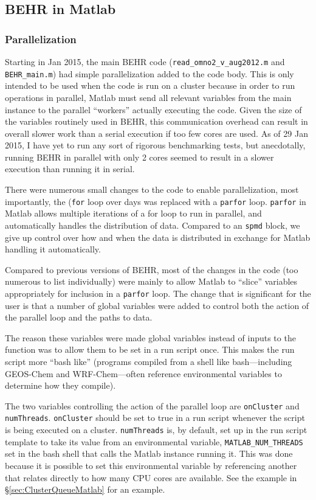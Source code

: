 \documentclass[12pt]{article}
\begin{document}
	\subsection{BEHR in Matlab}
	\subsubsection{Parallelization}
		Starting in Jan 2015, the main BEHR code (\texttt{read\_omno2\_v\_aug2012.m} and \texttt{BEHR\_main.m}) had simple parallelization added to the code body.  This is only intended to be used when the code is run on a cluster because in order to run operations in parallel, Matlab must send all relevant variables from the main instance to the parallel ``workers'' actually executing the code.  Given the size of the variables routinely used in BEHR, this communication overhead can result in overall slower work than a serial execution if too few cores are used.  As of 29 Jan 2015, I have yet to run any sort of rigorous benchmarking tests, but anecdotally, running BEHR in parallel with only 2 cores seemed to result in a slower execution than running it in serial.
		
		There were numerous small changes to the code to enable parallelization, most importantly, the (\texttt{for} loop over days was replaced with a \texttt{parfor} loop. \texttt{parfor} in Matlab allows multiple iterations of a for loop to run in parallel, and automatically handles the distribution of data.  Compared to an \texttt{spmd} block, we give up control over how and when the data is distributed in exchange for Matlab handling it automatically.
		
		Compared to previous versions of BEHR, most of the changes in the code (too numerous to list individually) were mainly to allow Matlab to ``slice'' variables appropriately for inclusion in a \texttt{parfor} loop.  The change that is significant for the user is that a number of global variables were added to control both the action of the parallel loop and the paths to data.  

		The reason these variables were made global variables instead of inputs to the function was to allow them to be set in a run script once. This makes the run script more ``bash like'' (programs compiled from a shell like bash---including GEOS-Chem and WRF-Chem---often reference environmental variables to determine how they compile).  
		
		The two variables controlling the action of the parallel loop are \texttt{onCluster} and \texttt{numThreads}. \texttt{onCluster} should be set to true in a run script whenever the script is being executed on a cluster.  \texttt{numThreads} is, by default, set up in the run script template to take its value from an environmental variable, \texttt{MATLAB\_NUM\_THREADS} set in the bash shell that calls the Matlab instance running it.  This was done because it is possible to set this environmental variable by referencing another that relates directly to how many CPU cores are available.  See the example in \S\ref{sec:ClusterQueueMatlab} for an example.
		
\end{document}
